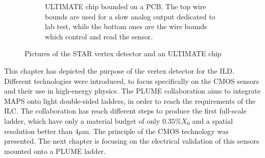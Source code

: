 \begin{figure}[!h]
\begin{subfigure}[t]{0.4\textwidth}
        \caption{ULTIMATE chip bounded on a PCB. The top wire bounds are used for a slow analog output dedicated to lab test, while the bottom ones are the wire bounds which control and read the sensor. }
        \label{fig:ultimate}
    \end{subfigure}
    \caption{Pictures of the STAR vertex detector and an ULTIMATE chip}\label{fig:Mi28}
    \end{figure}    


    This chapter has depicted the purpose of the vertex detector for the \gls{ILD}.
    Different technologies were introduced, to focus specifically on the \gls{CMOS} sensors and their use in high-energy physics.
    The \gls{PLUME} collaboration aims to integrate \gls{MAPS} onto light double-sided ladders, in order to reach the requirements of the \gls{ILC}.
    The collaboration has reach different steps to produce the first full-scale ladder, which have only a material budget of only $0.35\% X_0$ and a spatial resolution better than $4\mu\text{m}$.
    The principle of the \gls{CMOS} technology was presented. 
    The next chapter is focusing on the electrical validation of this sensors mounted onto a PLUME ladder.

    


